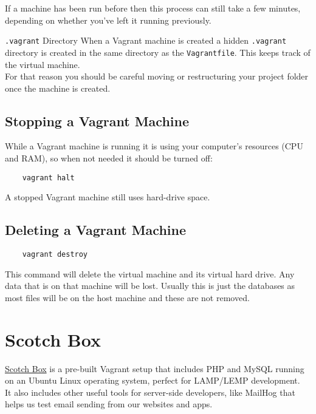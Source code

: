If a machine has been run before then this process can still take a few minutes, depending on whether you've left it running previously.

\begin{infobox}{\texttt{.vagrant} Directory}
    When a Vagrant machine is created a hidden \texttt{.vagrant} directory is created in the same directory as the \texttt{Vagrantfile}. This keeps track of the virtual machine.
    \\

    For that reason you should be careful moving or restructuring your project folder once the machine is created.
\end{infobox}


\subsection{Stopping a Vagrant Machine}

While a Vagrant machine is running it is using your computer's resources (CPU and RAM), so when not needed it should be turned off:

\begin{verbatim}
    vagrant halt
\end{verbatim}

A stopped Vagrant machine still uses hard-drive space.

\subsection{Deleting a Vagrant Machine}

\begin{verbatim}
    vagrant destroy
\end{verbatim}

This command will delete the virtual machine and its virtual hard drive. Any data that is on that machine will be lost. Usually this is just the databases as most files will be on the host machine and these are not removed.


\section{Scotch Box}

\href{https://box.scotch.io}{Scotch Box} is a pre-built Vagrant setup that includes PHP and MySQL running on an Ubuntu Linux operating system, perfect for LAMP/LEMP development.
\\

It also includes other useful tools for server-side developers, like MailHog that helps us test email sending from our websites and apps.

